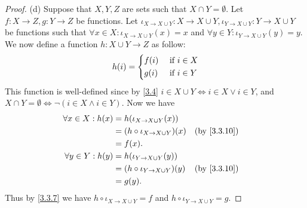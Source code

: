 \begin{proof}{(d)}
  Suppose that \(X, Y, Z\) are sets such that \(X \cap Y = \emptyset\).
  Let \(f : X \to Z, g : Y \to Z\) be functions.
  Let \(\iota_{X \to X \cup Y} : X \to X \cup Y, \iota_{Y \to X \cup Y} : Y \to X \cup Y\) be functions such that \(\forall x \in X : \iota_{X \to X \cup Y}(x) = x\) and \(\forall y \in Y : \iota_{Y \to X \cup Y}(y) = y\).
  We now define a function \(h : X \cup Y \to Z\) as follow:
  \[
    h(i) = \begin{dcases}
      f(i) & \text{ if } i \in X \\
      g(i) & \text{ if } i \in Y
    \end{dcases}
  \]
  This function is well-defined since by \cref{3.4} \(i \in X \cup Y \iff i \in X \lor i \in Y\), and \(X \cap Y = \emptyset \iff \lnot(i \in X \land i \in Y)\).
  Now we have
  \begin{align*}
    \forall x \in X : h(x) & = h(\iota_{X \to X \cup Y}(x))                                       \\
                           & = (h \circ \iota_{X \to X \cup Y})(x) &  & \text{(by \cref{3.3.10})} \\
                           & = f(x).                                                              \\
    \forall y \in Y : h(y) & = h(\iota_{Y \to X \cup Y}(y))                                       \\
                           & = (h \circ \iota_{Y \to X \cup Y})(y) &  & \text{(by \cref{3.3.10})} \\
                           & = g(y).
  \end{align*}
  Thus by \cref{3.3.7} we have \(h \circ \iota_{X \to X \cup Y} = f\) and \(h \circ \iota_{Y \to X \cup Y} = g\).


\end{proof}
